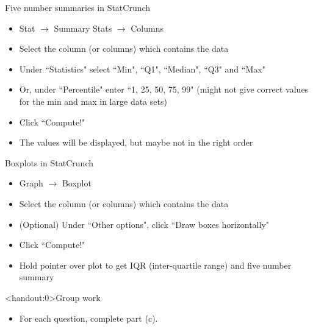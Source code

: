 \documentclass[xcolor=table, handout]{beamer}
\begin{document}
\begin{frame}{Five number summaries in StatCrunch}
\begin{block}{}
\begin{itemize}
\item Stat $\to$ Summary Stats $\to$ Columns
\item Select the column (or columns) which contains the data
\item Under ``Statistics" select ``Min", ``Q1", ``Median", ``Q3" and ``Max"
\item Or, under ``Percentile" enter ``1, 25, 50, 75, 99" (might not give correct values for the min and max in large data sets)
\item Click ``Compute!"
\item The values will be displayed, but maybe not in the right order
\end{itemize}
\end{block}

\end{frame}

\begin{frame}{Boxplots in StatCrunch}
\begin{block}{}
\begin{itemize}
\item Graph $\to$ Boxplot
\item Select the column (or columns) which contains the data
\item (Optional) Under ``Other options", click ``Draw boxes horizontally"
\item Click ``Compute!"
\item Hold pointer over plot to get IQR (inter-quartile range) and five number summary
\end{itemize}
\end{block}

\end{frame}

\begin{frame}<handout:0>{Group work}
\begin{block}{}
\large
\begin{itemize}
\item For each question, complete part (c).
\end{itemize}
\end{block}
\end{frame}
\end{document}
